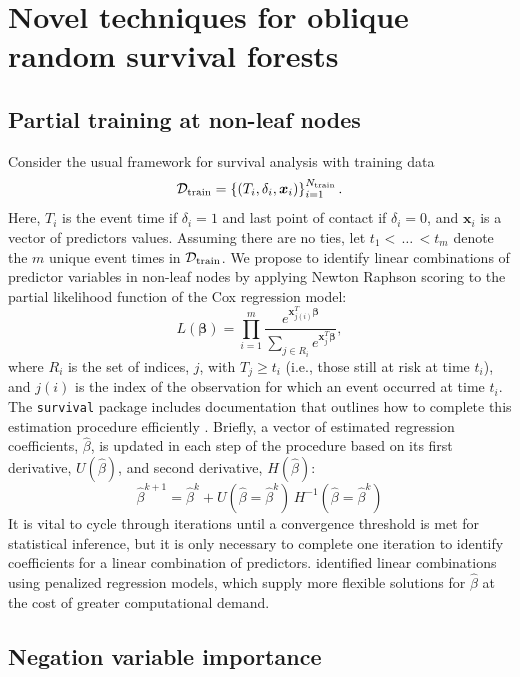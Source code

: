 \documentclass[twoside,11pt]{article}\usepackage[]{graphicx}\usepackage[]{xcolor}
\newcommand{\dataset}{{\cal D}}
\begin{document}
\section{Novel techniques for oblique random survival forests}

\subsection{Partial training at non-leaf nodes}

Consider the usual framework for survival analysis with training data $$\dataset_{\text{train}} = \left\{ (T_i, \delta_i, \bm{x}_{i}) \right\}_{i=1}^{N_{\text{train}}}.$$ Here, $T_i$ is the event time if $\delta_i=1$ and last point of contact if $\delta_i=0$, and $\bm{x}_i$ is a vector of predictors values. Assuming there are no ties, let $t_1 < \, \ldots \, < t_m$ denote the $m$ unique event times in $\dataset_{\text{train}}$. We propose to identify linear combinations of predictor variables in non-leaf nodes by applying Newton Raphson scoring to the partial likelihood function of the Cox regression model:
\begin{equation}\label{eqn:cox-partial-likelihood}
L(\bm\beta) = \prod_{i=1}^m \frac{e^{\bm{x}_{j(i)}^T \bm\beta}}{\sum_{j \in R_i} e^{\bm{x}_j^T \bm\beta}},
\end{equation}
where $R_i$ is the set of indices, $j$, with $T_j \geq t_i$ (i.e., those still at risk at time $t_i$), and $j(i)$ is the index of the observation for which an event occurred at time $t_i$. The \texttt{survival} package includes documentation that outlines how to complete this estimation procedure efficiently \citep[see][exact.nw]{therneau_survival_2022}. Briefly, a vector of estimated regression coefficients, $\hat{\beta}$, is updated in each step of the procedure based on its first derivative, $U(\hat{\beta})$, and second derivative, $H(\hat{\beta})$:
$$ \hat{\beta}^{k+1} =  \hat{\beta}^{k} + U(\hat{\beta} = \hat{\beta}^{k})\, H^{-1}(\hat{\beta} = \hat{\beta}^{k}) $$
It is vital to cycle through iterations until a convergence threshold is met for statistical inference, but it is only necessary to complete one iteration to identify coefficients for a linear combination of predictors. \citet{jaeger2019oblique} identified linear combinations using penalized regression models, which supply more flexible solutions for $\hat{\beta}$ at the cost of greater computational demand.

\subsection{Negation variable importance}
\end{document}
